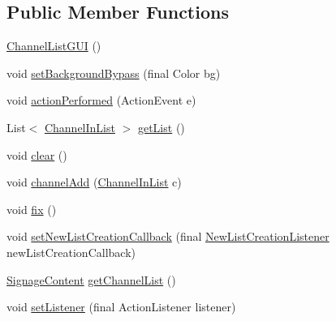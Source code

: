 \subsection*{Public Member Functions}
\begin{DoxyCompactItemize}
\item 
\hyperlink{classgov_1_1fnal_1_1ppd_1_1dd_1_1channel_1_1list_1_1ChannelListGUI_aa77fb4a7871b4c2661fe3638b773ed0a}{Channel\-List\-G\-U\-I} ()
\item 
void \hyperlink{classgov_1_1fnal_1_1ppd_1_1dd_1_1channel_1_1list_1_1ChannelListGUI_a0248f91962f51286514741ca3ae22be5}{set\-Background\-Bypass} (final Color bg)
\item 
void \hyperlink{classgov_1_1fnal_1_1ppd_1_1dd_1_1channel_1_1list_1_1ChannelListGUI_a12130d6b9b424cbf7c04999edd338e91}{action\-Performed} (Action\-Event e)
\item 
List$<$ \hyperlink{classgov_1_1fnal_1_1ppd_1_1dd_1_1channel_1_1ChannelInList}{Channel\-In\-List} $>$ \hyperlink{classgov_1_1fnal_1_1ppd_1_1dd_1_1channel_1_1list_1_1ChannelListGUI_a3f5795ae59811730376ca998cca2df38}{get\-List} ()
\item 
void \hyperlink{classgov_1_1fnal_1_1ppd_1_1dd_1_1channel_1_1list_1_1ChannelListGUI_a49d5de5df273113318fc59de3d298967}{clear} ()
\item 
void \hyperlink{classgov_1_1fnal_1_1ppd_1_1dd_1_1channel_1_1list_1_1ChannelListGUI_aac2bcf918b3c9685681739a3dcbdf9c4}{channel\-Add} (\hyperlink{classgov_1_1fnal_1_1ppd_1_1dd_1_1channel_1_1ChannelInList}{Channel\-In\-List} c)
\item 
void \hyperlink{classgov_1_1fnal_1_1ppd_1_1dd_1_1channel_1_1list_1_1ChannelListGUI_a8baf2ca96aea0b400f39ce50297f191b}{fix} ()
\item 
void \hyperlink{classgov_1_1fnal_1_1ppd_1_1dd_1_1channel_1_1list_1_1ChannelListGUI_aab16046287399636afa75b7d299c2048}{set\-New\-List\-Creation\-Callback} (final \hyperlink{interfacegov_1_1fnal_1_1ppd_1_1dd_1_1channel_1_1list_1_1NewListCreationListener}{New\-List\-Creation\-Listener} new\-List\-Creation\-Callback)
\item 
\hyperlink{interfacegov_1_1fnal_1_1ppd_1_1dd_1_1signage_1_1SignageContent}{Signage\-Content} \hyperlink{classgov_1_1fnal_1_1ppd_1_1dd_1_1channel_1_1list_1_1ChannelListGUI_aec3f27a75e070f286225a7e8e69aeca1}{get\-Channel\-List} ()
\item 
void \hyperlink{classgov_1_1fnal_1_1ppd_1_1dd_1_1channel_1_1list_1_1ChannelListGUI_ac4fca92d4bc81f9ed0ba0c53b31a07e7}{set\-Listener} (final Action\-Listener listener)
\end{DoxyCompactItemize}
